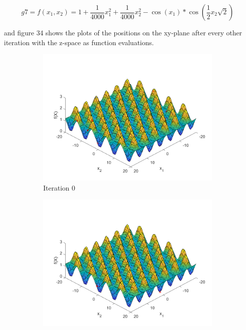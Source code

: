 $$
  g7=f(x_1, x_2) = 1 + \frac{1}{4000}x_1^2 + \frac{1}{4000}x_2^2 - \cos(x_1) * \cos(\frac{1}{2}x_2\sqrt{2})
$$

and figure 34 shows the plots of the positions on the xy-plane after every other iteration with the z-space as function evaluations.

\begin{figure}
  \centering
 \begin{subfigure}[b]{0.4\textwidth}
   \includegraphics[width=\textwidth]{img/smpl/grwnk2d/loa-iter-0}
   \caption{Iteration 0}
   \label{fig:s7-iter-0}
 \end{subfigure}
 \begin{subfigure}[b]{0.4\textwidth}
   \includegraphics[width=\textwidth]{img/smpl/grwnk2d/loa-iter-7}

\end{subfigure}
\end{figure}
